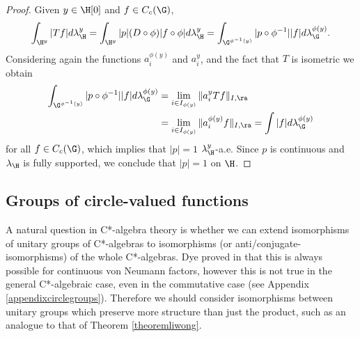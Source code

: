 \begin{proof}
Given $y\in\H[0]$  and $f\in C_c(\G)$,
\[\int_{\H^y}|Tf|d\lambda_{\H}^y=\int_{\H^y} |p|(D\circ\phi)|f\circ\phi|d\lambda_{\H}^y=\int_{\G^{\phi^{-1}(y)}} |p\circ\phi^{-1}||f|d\lambda_{\G}^{\phi(y)}.\]
Considering again the functions $a^{\phi(y)}_i$ and $a^y_i$, and the fact that $T$ is isometric we obtain
\begin{align*}
\int_{\G^{\phi^{-1}(y)}} |p\circ\phi^{-1}||f|d\lambda_{\G}^{\phi(y)}&=\lim_{i\in I_{\phi(y)}}\Vert a_i^y Tf\Vert_{I,\ra}\\
&=\lim_{i\in I_{\phi(y)}}\Vert a_i^{\phi(y)} f\Vert_{I,\ra}= \int |f|d\lambda_{\G}^{\phi(y)}
\end{align*}
for all $f\in C_c(\G)$, which implies that $|p|=1$ $\lambda_{\H}^y$-a.e. Since $p$ is continuous and $\lambda_{\H}$ is fully supported, we conclude that $|p|=1$ on $\H$.\qedhere

%
\end{proof}

\subsection{Groups of circle-valued functions}
\nocite{MR3552377}
A natural question in C*-algebra theory is whether we can extend isomorphisms of unitary groups of C*-algebras to isomorphisms (or anti/conjugate-isomorphisms) of the whole C*-algebras. Dye proved in \cite{MR0066568} that this is always possible for continuous von Neumann factors, however this is not true in the general C*-algebraic case, even in the commutative case (see Appendix \ref{appendixcirclegroups}). Therefore we should consider isomorphisms between unitary groups which preserve more structure than just the product, such as an analogue to that of Theorem \ref{theoremliwong}.


